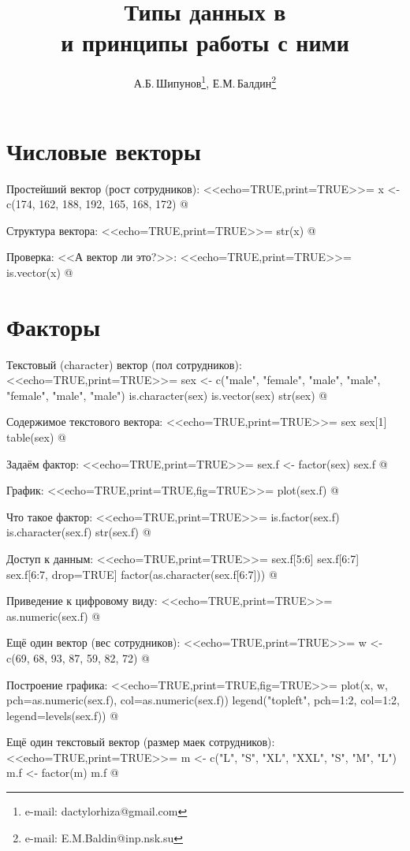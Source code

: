 \documentclass[a4paper,11pt]{scrartcl}
\title{Типы данных в \R \\ и принципы работы с ними}
\author{\textcopyright{} А.Б.\,Шипунов\thanks{e-mail: dactylorhiza@gmail.com},
     Е.М.\,Балдин\thanks{e-mail: E.M.Baldin@inp.nsk.su}}
\begin{document}
\maketitle



\section{Числовые векторы}
\label{sec:vectors}

Простейший вектор (рост сотрудников):
<<echo=TRUE,print=TRUE>>=
x <- c(174, 162, 188, 192, 165, 168, 172)
@

Структура вектора:
<<echo=TRUE,print=TRUE>>=
str(x)
@ 

Проверка: <<А вектор ли это?>>:
<<echo=TRUE,print=TRUE>>=
is.vector(x)
@ 
 
\section{Факторы}
\label{sec:factors}

Текстовый (character) вектор (пол сотрудников):
<<echo=TRUE,print=TRUE>>=
sex <- c("male", "female", "male", "male", "female", "male", "male")
is.character(sex)
is.vector(sex)
str(sex)
@ 

Содержимое текстового вектора:
<<echo=TRUE,print=TRUE>>=
sex
sex[1]
table(sex)
@ 

Задаём фактор:
<<echo=TRUE,print=TRUE>>=
sex.f <- factor(sex)
sex.f
@ 

График:
<<echo=TRUE,print=TRUE,fig=TRUE>>=
plot(sex.f)
@ 

Что такое фактор:
<<echo=TRUE,print=TRUE>>=
is.factor(sex.f)
is.character(sex.f)
str(sex.f)
@ 

Доступ к данным:
<<echo=TRUE,print=TRUE>>=
sex.f[5:6]
sex.f[6:7]
sex.f[6:7, drop=TRUE]
factor(as.character(sex.f[6:7]))
@ 

Приведение к цифровому виду:
<<echo=TRUE,print=TRUE>>=
as.numeric(sex.f)
@ 

Ещё один вектор (вес сотрудников):
<<echo=TRUE,print=TRUE>>=
w <- c(69, 68, 93, 87, 59, 82, 72)
@ 

Построение графика:
<<echo=TRUE,print=TRUE,fig=TRUE>>=
plot(x, w, pch=as.numeric(sex.f), col=as.numeric(sex.f))
legend("topleft", pch=1:2, col=1:2, legend=levels(sex.f))
@ 

Ещё один текстовый вектор (размер маек сотрудников):
<<echo=TRUE,print=TRUE>>=
m <- c("L", "S", "XL", "XXL", "S", "M", "L")
m.f <- factor(m)
m.f
@ 
\end{document}

